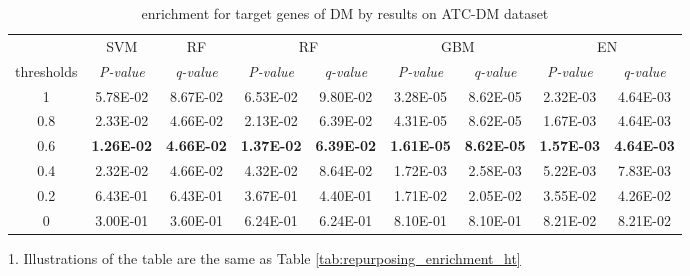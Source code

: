       \begin{table}[htbp]
        \centering
        \caption{enrichment for target genes of DM by results on ATC-DM dataset}
        \begin{threeparttable}
          \tabcolsep=0.10cm
          \begin{tabular}{ccccccccc}
            \toprule
                  & SVM   & RF    & \multicolumn{2}{c}{RF} & \multicolumn{2}{c}{GBM} & \multicolumn{2}{c}{EN} \\
            thresholds & \textit{P-value} & \textit{q-value} & \textit{P-value} & \textit{q-value} & \textit{P-value} & \textit{q-value} & \textit{P-value} & \textit{q-value} \\
            \midrule
            1     & 5.78E-02 & 8.67E-02 & 6.53E-02 & 9.80E-02 & 3.28E-05 & 8.62E-05 & 2.32E-03 & 4.64E-03 \\
            0.8   & 2.33E-02 & 4.66E-02 & 2.13E-02 & 6.39E-02 & 4.31E-05 & 8.62E-05 & 1.67E-03 & 4.64E-03 \\
            0.6   & \textbf{1.26E-02} & \textbf{4.66E-02} & \textbf{1.37E-02} & \textbf{6.39E-02} & \textbf{1.61E-05} & \textbf{8.62E-05} & \textbf{1.57E-03} & \textbf{4.64E-03} \\
            0.4   & 2.32E-02 & 4.66E-02 & 4.32E-02 & 8.64E-02 & 1.72E-03 & 2.58E-03 & 5.22E-03 & 7.83E-03 \\
            0.2   & 6.43E-01 & 6.43E-01 & 3.67E-01 & 4.40E-01 & 1.71E-02 & 2.05E-02 & 3.55E-02 & 4.26E-02 \\
            0     & 3.00E-01 & 3.60E-01 & 6.24E-01 & 6.24E-01 & 8.10E-01 & 8.10E-01 & 8.21E-02 & 8.21E-02 \\
            \bottomrule
            \end{tabular}%
            \begin{tablenotes}
              \item 1. Illustrations of the table are the same as Table \ref{tab:repurposing_enrichment_ht}
            \end{tablenotes}
          \end{threeparttable}
          \label{tab:repurposing_enrichment_dm}%
        \end{table}%

